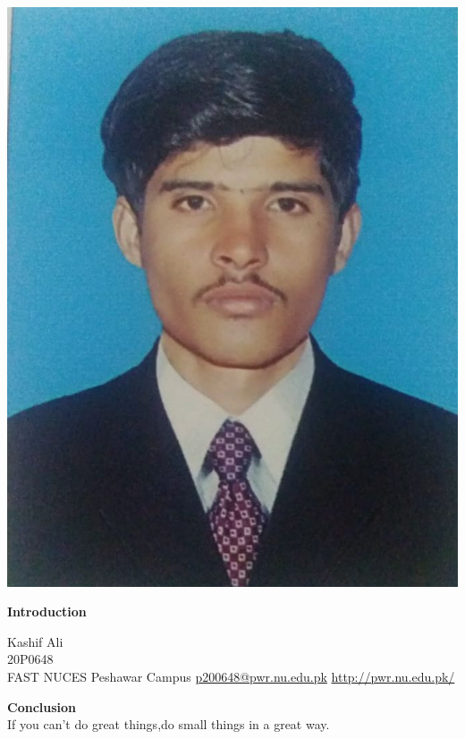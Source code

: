 \documentclass{article}
\begin{document}
\hspace*{96mm} \includegraphics[scale=0.1]{222.jpg}
\vspace{-6cm}

	
\vspace{12pt}
\begin{center}
\Huge  \textbf{Introduction}\\
\vspace{7pt}
\begin{flushleft}
\huge
Kashif Ali\\
20P0648\\
FAST NUCES Peshawar Campus
\url{p200648@pwr.nu.edu.pk}
\url{http://pwr.nu.edu.pk/}
\begin{center}
\Huge \textbf{Conclusion}\\
If you can't do great things,do small things in a great way.

\end{center}



\end{flushleft}
\end{center}
\end{document}
